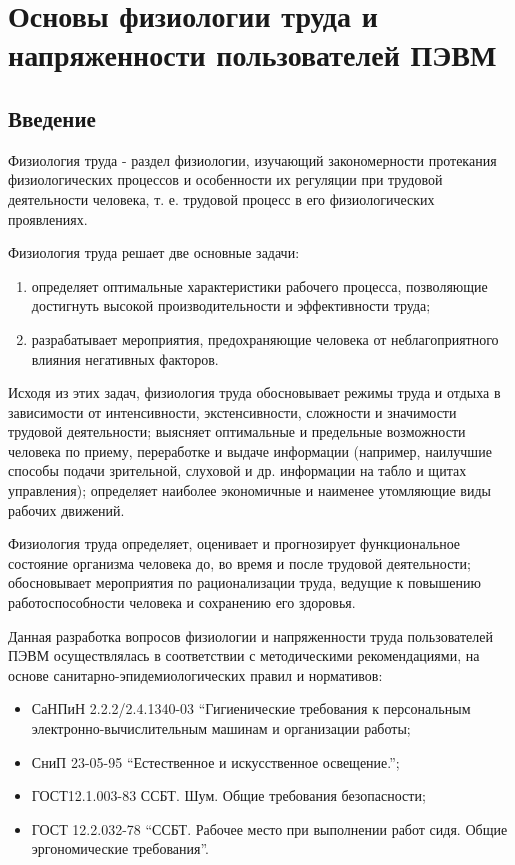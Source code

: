 \section{Основы физиологии труда и напряженности пользователей ПЭВМ}
\subsection{Введение}
Физиология труда - раздел физиологии, изучающий закономерности протекания физиологических процессов и особенности их регуляции при трудовой деятельности человека, т. е. трудовой процесс в его физиологических проявлениях. 

Физиология труда решает две основные задачи:
\begin{enumerate}
\item определяет оптимальные характеристики рабочего процесса, позволяющие достигнуть высокой производительности и эффективности труда;
\item разрабатывает мероприятия, предохраняющие человека от неблагоприятного влияния негативных факторов.
\end{enumerate}

Исходя из этих задач, физиология труда обосновывает режимы труда и отдыха в зависимости от интенсивности, экстенсивности, сложности и значимости трудовой деятельности; выясняет оптимальные и предельные возможности человека по приему, переработке и выдаче информации (например, наилучшие способы подачи зрительной, слуховой и др. информации на табло и щитах управления); определяет наиболее экономичные и наименее утомляющие виды рабочих движений.

Физиология труда определяет, оценивает и прогнозирует функциональное состояние организма человека до, во время и после трудовой деятельности; обосновывает мероприятия по рационализации труда, ведущие к повышению работоспособности человека и сохранению его здоровья.

Данная разработка вопросов физиологии и напряженности труда пользователей ПЭВМ осуществлялась в соответствии с методическими рекомендациями, на основе санитарно-эпидемиологических правил и нормативов:
\begin{itemize}
\item СаНПиН 2.2.2/2.4.1340-03 “Гигиенические требования к персональным электронно-вычислительным машинам и организации работы;
\item СниП 23-05-95 “Естественное и искусственное освещение.”;
\item ГОСТ12.1.003-83 ССБТ. Шум. Общие требования безопасности;
\item ГОСТ 12.2.032-78 “ССБТ. Рабочее место при выполнении работ сидя. Общие эргономические требования”.
\end{itemize}

